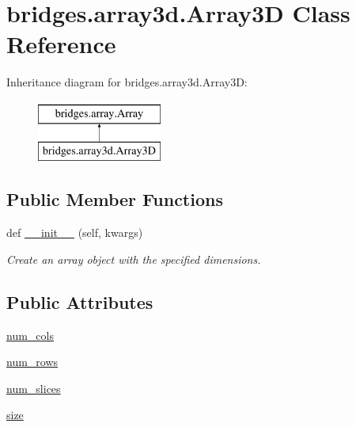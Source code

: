 \hypertarget{classbridges_1_1array3d_1_1_array3_d}{}\section{bridges.\+array3d.\+Array3D Class Reference}
\label{classbridges_1_1array3d_1_1_array3_d}
Inheritance diagram for bridges.\+array3d.\+Array3D\+:\begin{figure}[H]
\begin{center}
\leavevmode
\includegraphics[height=2.000000cm]{classbridges_1_1array3d_1_1_array3_d}
\end{center}
\end{figure}
\subsection*{Public Member Functions}
\begin{DoxyCompactItemize}
\item 
def \hyperlink{classbridges_1_1array3d_1_1_array3_d_a2ab3261c784068e2b4fdf388a972b1e3}{\+\_\+\+\_\+init\+\_\+\+\_\+} (self, kwargs)
\begin{DoxyCompactList}\small\item\em Create an array object with the specified dimensions. \end{DoxyCompactList}\end{DoxyCompactItemize}
\subsection*{Public Attributes}
\begin{DoxyCompactItemize}
\item 
\hyperlink{classbridges_1_1array3d_1_1_array3_d_a94ce27f39ece55011ba1f7e69789b922}{num\+\_\+cols}
\item 
\hyperlink{classbridges_1_1array3d_1_1_array3_d_ace9d503bee9ef115fef871d39a0fdf3e}{num\+\_\+rows}
\item 
\hyperlink{classbridges_1_1array3d_1_1_array3_d_a519f08df9d0c30d558bfe1adc9168a4d}{num\+\_\+slices}
\item 
\hyperlink{classbridges_1_1array3d_1_1_array3_d_a7ecd7b927397aef7c4a2af96018b96dc}{size}
\end{DoxyCompactItemize}
